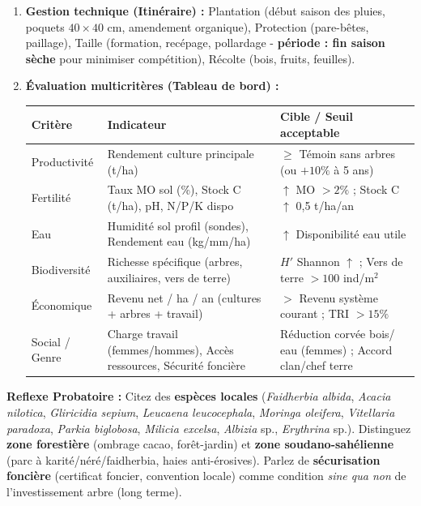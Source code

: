 \documentclass[11pt]{article}
\begin{document}
\begin{methode}
\begin{enumerate}
\begin{itemize}
            \item \textbf{Bordures / Haies vives / Brise-vent} : Délimitation, protection, biodiversité.
        \end{itemize}
        \item \textbf{Gestion technique (Itinéraire) :} Plantation (début saison des pluies, poquets $40 \times 40$ cm, amendement organique), Protection (pare-bêtes, paillage), Taille (formation, recépage, pollardage - \textbf{période : fin saison sèche} pour minimiser compétition), Récolte (bois, fruits, feuilles).
        \item \textbf{Évaluation multicritères (Tableau de bord) :}
        \begin{center}
            \begin{tabularx}{\linewidth}{|l|X|X|}\hline
            \rowcolor{popblueL}
            \textbf{Critère} & \textbf{Indicateur} & \textbf{Cible / Seuil acceptable} \\ \hline
            Productivité & Rendement culture principale (t/ha) & $\ge$ Témoin sans arbres (ou $+10\%$ à 5 ans) \\ \hline
            Fertilité & Taux MO sol (\%), Stock C (t/ha), pH, N/P/K dispo & $\uparrow$ MO $> 2\%$ ; Stock C $\uparrow$ 0,5 t/ha/an \\ \hline
            Eau & Humidité sol profil (sondes), Rendement eau (kg/mm/ha) & $\uparrow$ Disponibilité eau utile \\ \hline
            Biodiversité & Richesse spécifique (arbres, auxiliaires, vers de terre) & $H'$ Shannon $\uparrow$ ; Vers de terre $> 100$ ind/m$^2$ \\ \hline
            Économique & Revenu net / ha / an (cultures + arbres + travail) & $>$ Revenu système courant ; TRI $> 15\%$ \\ \hline
            Social / Genre & Charge travail (femmes/hommes), Accès ressources, Sécurité foncière & Réduction corvée bois/ eau (femmes) ; Accord clan/chef terre \\ \hline
        \end{tabularx}
    \end{center}
    \end{enumerate}
    \textbf{Reflexe Probatoire :} Citez des \textbf{espèces locales} (\emph{Faidherbia albida}, \emph{Acacia nilotica}, \emph{Gliricidia sepium}, \emph{Leucaena leucocephala}, \emph{Moringa oleifera}, \emph{Vitellaria paradoxa}, \emph{Parkia biglobosa}, \emph{Milicia excelsa}, \emph{Albizia} sp., \emph{Erythrina} sp.). Distinguez \textbf{zone forestière} (ombrage cacao, forêt-jardin) et \textbf{zone soudano-sahélienne} (parc à karité/néré/faidherbia, haies anti-érosives). Parlez de \textbf{sécurisation foncière} (certificat foncier, convention locale) comme condition \textit{sine qua non} de l'investissement arbre (long terme).
\end{methode}
\end{document}
